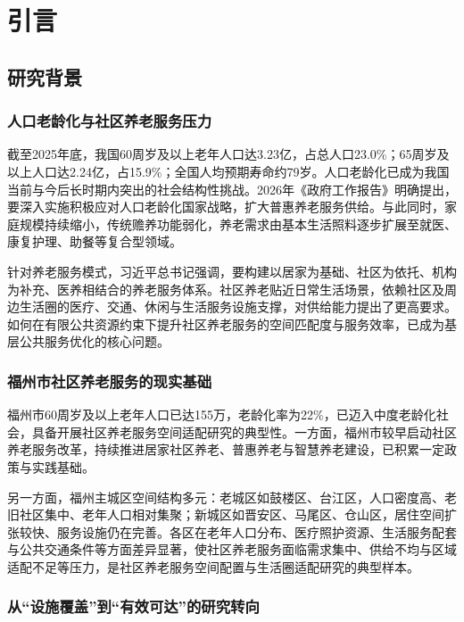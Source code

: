 \section{引言}

\subsection{研究背景}

\subsubsection{人口老龄化与社区养老服务压力}

截至2025年底，我国60周岁及以上老年人口达3.23亿，占总人口23.0\%；65周岁及以上人口达2.24亿，占15.9\%；全国人均预期寿命约79岁。人口老龄化已成为我国当前与今后长时期内突出的社会结构性挑战。2026年《政府工作报告》明确提出，要深入实施积极应对人口老龄化国家战略，扩大普惠养老服务供给。与此同时，家庭规模持续缩小，传统赡养功能弱化，养老需求由基本生活照料逐步扩展至就医、康复护理、助餐等复合型领域。

针对养老服务模式，习近平总书记强调，要构建以居家为基础、社区为依托、机构为补充、医养相结合的养老服务体系。社区养老贴近日常生活场景，依赖社区及周边生活圈的医疗、交通、休闲与生活服务设施支撑，对供给能力提出了更高要求。如何在有限公共资源约束下提升社区养老服务的空间匹配度与服务效率，已成为基层公共服务优化的核心问题。

\subsubsection{福州市社区养老服务的现实基础}

福州市60周岁及以上老年人口已达155万，老龄化率为22\%，已迈入中度老龄化社会，具备开展社区养老服务空间适配研究的典型性。一方面，福州市较早启动社区养老服务改革，持续推进居家社区养老、普惠养老与智慧养老建设，已积累一定政策与实践基础。

另一方面，福州主城区空间结构多元：老城区如鼓楼区、台江区，人口密度高、老旧社区集中、老年人口相对集聚；新城区如晋安区、马尾区、仓山区，居住空间扩张较快、服务设施仍在完善。各区在老年人口分布、医疗照护资源、生活服务配套与公共交通条件等方面差异显著，使社区养老服务面临需求集中、供给不均与区域适配不足等压力，是社区养老服务空间配置与生活圈适配研究的典型样本。

\subsubsection{从“设施覆盖”到“有效可达”的研究转向}


